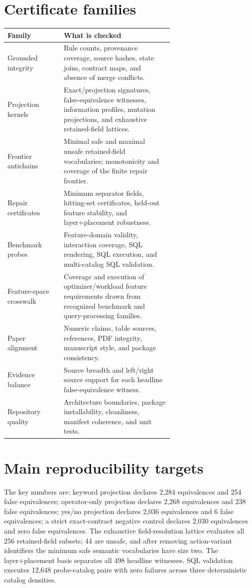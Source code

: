\documentclass[10pt]{article}
\begin{document}
\section*{Certificate families}
\begin{center}
\small
\begin{tabular}{lp{0.66\linewidth}}
\toprule
Family & What is checked \\
\midrule
Grounded integrity & Rule counts, provenance coverage, source hashes, state joins, contract maps, and absence of merge conflicts. \\
Projection kernels & Exact/projection signatures, false-equivalence witnesses, information profiles, mutation projections, and exhaustive retained-field lattices. \\
Frontier antichains & Minimal safe and maximal unsafe retained-field vocabularies; monotonicity and coverage of the finite repair frontier. \\
Repair certificates & Minimum separator fields, hitting-set certificates, held-out feature stability, and layer+placement robustness. \\
Benchmark probes & Feature-domain validity, interaction coverage, SQL rendering, SQL execution, and multi-catalog SQL validation. \\
Feature-space crosswalk & Coverage and execution of optimizer/workload feature requirements drawn from recognized benchmark and query-processing families. \\
Paper alignment & Numeric claims, table sources, references, PDF integrity, manuscript style, and package consistency. \\
Evidence balance & Source breadth and left/right source support for each headline false-equivalence witness. \\
Repository quality & Architecture boundaries, package installability, cleanliness, manifest coherence, and unit tests. \\
\bottomrule
\end{tabular}
\end{center}

\section*{Main reproducibility targets}
The key numbers are: keyword projection declares 2,284 equivalences and 254 false equivalences; operator-only projection declares 2,268 equivalences and 238 false equivalences; yes/no projection declares 2,036 equivalences and 6 false equivalences; a strict exact-contract negative control declares 2,030 equivalences and zero false equivalences.  The exhaustive field-resolution lattice evaluates all 256 retained-field subsets; 44 are unsafe, and after removing action-variant identifiers the minimum safe semantic vocabularies have size two.  The layer+placement basis separates all 498 headline witnesses.  SQL validation executes 12,648 probe-catalog pairs with zero failures across three deterministic catalog densities.
\end{document}
